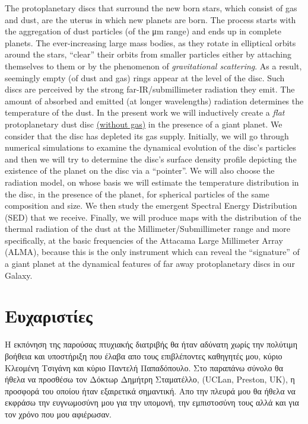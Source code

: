 \documentclass[12pt,twoside]{report}
\numberwithin{equation}{section}
\newcommand{\en} {\selectlanguage {english}}
\newcommand{\gr} {\selectlanguage {greek}}
\begin{document}
The protoplanetary discs that surround the new born stars, which consist of gas and dust, are the uterus in which new planets are born. The process starts with the aggregation of dust particles (of the {\gr μ}m range) and ends up in complete planets. The ever-increasing large mass bodies, as they rotate in elliptical orbits around the stars, ``clear'' their orbits from smaller particles either by attaching themselves to them or by the phenomenon of {\it gravitational scattering}. As a result, seemingly empty (of dust and gas) rings appear at the level of the disc. Such discs are perceived by the strong far-IR/submillimeter radiation they emit. The amount of absorbed and emitted (at longer wavelengths) radiation determines the temperature of the dust. In the present work we will inductively create a {\it flat} protoplanetary dust disc \underline{(without gas)} in the presence of a giant planet. We consider that the disc has depleted its gas supply. Initially, we will go through numerical simulations to examine the dynamical evolution of the disc's particles and then we will try to determine the disc's surface density profile depicting the existence of the planet on the disc via a ``pointer''. We will also choose the radiation model, on whose basis we will estimate the temperature distribution in the disc, in the presence of the planet, for spherical particles of the same composition and size. We then study the emergent Spectral Energy Distribution (SED) that we receive. Finally, we will produce maps with the distribution of the thermal radiation of the dust at the Millimeter/Submillimeter range and more specifically, at the basic frequencies of the Attacama Large Millimeter Array (ALMA), because this is the only instrument which can reveal the ``signature'' of a giant planet at the dynamical features of far away protoplanetary discs in our Galaxy.

\newpage
\gr
\chapter*{Ευχαριστίες}

Η εκπόνηση της παρούσας πτυχιακής διατριβής θα ήταν αδύνατη χωρίς την πολύτιμη βοήθεια και υποστήριξη που έλαβα απο τους επιβλέποντες καθηγητές μου, κύριο Κλεομένη Τσιγάνη και κύριο Παντελή Παπαδόπουλο. Στο παραπάνω σύνολο θα ήθελα να προσθέσω τον Δόκτωρ Δημήτρη Σταματέλλο, {\en (UCLan, Preston, UK)}, η προσφορά του οποίου ήταν εξαιρετικά σημαντική. Απο την πλευρά μου θα ήθελα να εκφράσω την ευγνωμοσύνη μου για την υπομονή, την εμπιστοσύνη τους αλλά και για τον χρόνο που μου αφιέρωσαν.
\end{document}
